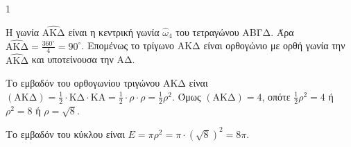 \begin{ylh}{1}
    \item [Ύλη από εικόνα]
\end{ylh}
\begin{alist}
    \item Η γωνία $\hat{\text{ΑΚΔ}}$ είναι η κεντρική γωνία $\hat{\omega}_4$ του τετραγώνου ΑΒΓΔ. Άρα $\hat{\text{ΑΚΔ}} = \frac{360^\circ}{4} = 90^\circ$. Επομένως το τρίγωνο ΑΚΔ είναι ορθογώνιο με ορθή γωνία την $\hat{\text{ΑΚΔ}}$ και υποτείνουσα την ΑΔ.
    \item
    \begin{rlist}
        \item Το εμβαδόν του ορθογωνίου τριγώνου ΑΚΔ είναι $(\text{ΑΚΔ}) = \frac{1}{2} \cdot \text{ΚΔ} \cdot \text{ΚΑ} = \frac{1}{2} \cdot \rho \cdot \rho = \frac{1}{2} \rho^2$. Όμως $(\text{ΑΚΔ})=4$, οπότε $\frac{1}{2}\rho^2 = 4$ ή $\rho^2 = 8$ ή $\rho = \sqrt{8}$.
        \item Το εμβαδόν του κύκλου είναι $E = \pi\rho^2 = \pi \cdot (\sqrt{8})^2 = 8\pi$.
    \end{rlist}
\end{alist}